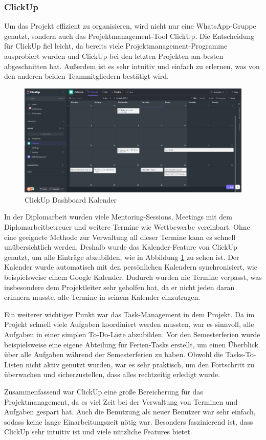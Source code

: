 \subsubsection{ClickUp}
Um das Projekt effizient zu organisieren, wird nicht nur
eine WhatsApp-Gruppe genutzt, sondern auch das
Projektmanagement-Tool ClickUp. Die Entscheidung für ClickUp
fiel leicht, da bereits viele Projektmanagement-Programme
ausprobiert wurden und ClickUp bei den letzten Projekten am
besten abgeschnitten hat. Außerdem ist es sehr intuitiv und
einfach zu erlernen, was von den anderen beiden Teammitgliedern
bestätigt wird.

\begin{figure}[h]
    \centering
    \includegraphics[width=1\textwidth]{./pics/clickup-calender-view.png}
    \caption{ClickUp Dashboard Kalender}
    \label{fig:clickup-calendar}
\end{figure}


In der Diplomarbeit wurden viele Mentoring-Sessions, Meetings mit dem Diplomarbeitbetreuer und weitere Termine wie Wettbewerbe vereinbart. Ohne eine geeignete Methode zur Verwaltung all dieser Termine kann es schnell unübersichtlich werden. Deshalb wurde das Kalender-Feature von ClickUp genutzt, um alle Einträge abzubilden, wie in Abbildung \ref{fig:clickup-calendar} zu sehen ist. Der Kalender wurde automatisch mit den persönlichen Kalendern synchronisiert, wie beispielsweise einem Google Kalender. Dadurch wurden nie Termine verpasst, was insbesondere dem Projektleiter sehr geholfen hat, da er nicht jeden daran erinnern musste, alle Termine in seinem Kalender einzutragen.

Ein weiterer wichtiger Punkt war das Task-Management in dem Projekt. Da im Projekt schnell viele Aufgaben koordiniert werden mussten, war es sinnvoll, alle Aufgaben in einer simplen To-Do-Liste abzubilden. Vor den Semesterferien wurde beispielsweise eine eigene Abteilung für Ferien-Tasks erstellt, um einen Überblick über alle Aufgaben während der Semesterferien zu haben. Obwohl die Tasks-To-Listen nicht aktiv genutzt wurden, war es sehr praktisch, um den Fortschritt zu überwachen und sicherzustellen, dass alles rechtzeitig erledigt wurde.

Zusammenfassend war ClickUp eine große Bereicherung für das
Projektmanagement, da es viel Zeit bei der Verwaltung von
Terminen und Aufgaben gespart hat. Auch die Benutzung als
neuer Benutzer war sehr einfach, sodass keine lange
Einarbeitungszeit nötig war. Besonders faszinierend ist,
dass ClickUp sehr intuitiv ist und viele nützliche Features
bietet.

